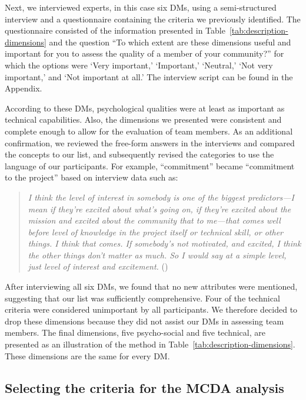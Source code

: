 Next, we interviewed experts, in this case six DMs, using a semi-structured
interview and a questionnaire containing the criteria we previously 
identified. The questionnaire consisted of the information presented in
Table~\ref{tab:description-dimensions} and the question
``To which extent are these dimensions useful and important for you 
to assess the quality of a member of your community?'' for which the options were
`Very important,' `Important,' `Neutral,' `Not very important,' and
`Not important at all.' The interview script can be found in the Appendix.

According to these DMs, psychological qualities were at least as important as technical capabilities. Also, the dimensions we presented were consistent and complete enough to allow for the evaluation of team members. As an additional confirmation, we reviewed the free-form answers in the interviews and compared the concepts to our list, and subsequently revised the categories to use the language of our participants. 
For example, ``commitment'' became ``commitment to the project'' based on interview data such as:
\begin{quote}
{\em
I think the level of interest in somebody is one of the biggest predictors---I 
mean if they're excited about what's going on, if they're excited about the 
mission and excited about the community that to me---that comes well before level of knowledge in the project itself or technical skill, or other things. I think that comes. If somebody's not motivated, and excited, I think the other things don't matter as much. So I would say at a simple level, just level of interest 
and excitement.} (\DB)
\end{quote}

After interviewing all six DMs, we found that no new attributes were
mentioned, suggesting that our list was sufficiently comprehensive. 
Four of the technical criteria were considered unimportant by all 
participants. We therefore decided to drop these dimensions because
they did not assist our DMs in assessing team members.
The final dimensions, five psycho-social and five technical, are presented as an illustration of the method in Table~\ref{tab:description-dimensions}. These dimensions are the same for every DM.



\subsection{Selecting the criteria for the MCDA analysis}\label{sec:results:sub:subset}

